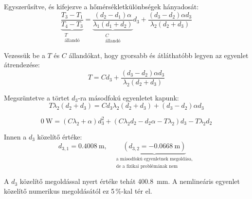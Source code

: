 Egyszerűsítve, és kifejezve a hőmérsékletkülönbségek hányadosát:
\begin{equation}
	\underbrace{\dfrac{T_3 - T_1}{T_4 - T_3}}_{\substack{T \\ \text{állandó}}}
	= 
	\underbrace{\dfrac{\left(d_2-d_1\right)\alpha}{\lambda_1\left(d_1+d_2\right)}}_{\substack{C \\ \text{állandó}}} d_3
	+ 
	\dfrac{\left(d_3-d_2\right) \alpha d_3}{\lambda_2\left(d_2+d_3\right)}
\end{equation}

Vezessük be a $T$ és $C$ állandókat, hogy gyorsabb és átláthatóbb legyen az egyenlet átrendezése:
\begin{equation}
	T = C d_3 +  \dfrac{\left(d_3-d_2\right) \alpha d_3}{\lambda_2\left(d_2+d_3\right)}
\end{equation}

Megszüntetve a törtet $d_3$-ra másodfokú egyenletet kapunk:
\begin{equation}
	T \lambda_2\left(d_2+d_3\right) = C d_3 \lambda_2\left(d_2+d_3\right) + \left(d_3-d_2\right) \alpha d_3
\end{equation}

\begin{equation}
	\SI{0}{\watt} = \left(C \lambda_2 +\alpha\right)d_3^2 + \left(C \lambda_2 d_2 - d_2 \alpha - T \lambda_2 \right) d_3 - T \lambda_2 d_2
\end{equation}

Innen a $d_3$ közelítő értéke:
\begin{equation}
	d_{3,1} = \SI{0.4008}{\meter}, 
	\quad 
	\underbrace{
		\left(d_{3,2} = \SI{-0.0668}{\meter}\right)
	}_{\substack{\text{a másodfokú egyenletnek megoldása,} \\ \text{de a fizikai problémának nem}}}
\end{equation}

A $d_3$ közelítő megoldással nyert értéke tehát \SI{400.8}{\milli\meter}. A nemlineáris egyenlet közelítő numerikus megoldásától ez 5\,\%-kal tér el.

\pagebreak